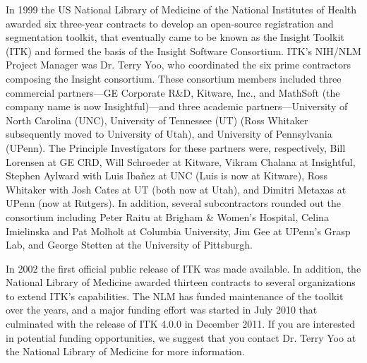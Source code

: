 In 1999 the US National Library of Medicine of the National Institutes of
Health awarded six three-year contracts to develop an open-source
registration and segmentation toolkit, that eventually came to be known as
the Insight Toolkit (ITK) and formed the basis of the Insight Software
Consortium. ITK's NIH/NLM Project Manager was Dr. Terry Yoo, who coordinated the
six prime contractors composing the Insight consortium. These consortium
members included three commercial partners---GE Corporate R\&D, Kitware,
Inc., and MathSoft (the company name is now Insightful)---and three academic
partners---University of North Carolina (UNC), University of Tennessee (UT)
(Ross Whitaker subsequently moved to University of Utah), and University of
Pennsylvania (UPenn). The Principle Investigators for these partners were,
respectively, Bill Lorensen at GE CRD, Will Schroeder at Kitware, Vikram
Chalana at Insightful, Stephen Aylward with Luis Iba\~{n}ez at UNC (Luis is now
at Kitware), Ross Whitaker with Josh Cates at UT (both now at Utah), and
Dimitri Metaxas at UPenn (now at Rutgers). In addition, several
subcontractors rounded out the consortium including Peter Raitu at Brigham \&
Women's Hospital, Celina Imielinska and Pat Molholt at Columbia University,
Jim Gee at UPenn's Grasp Lab, and George Stetten at the University of
Pittsburgh.

In 2002 the first official public release of ITK was made available. In
addition, the National Library of Medicine awarded thirteen contracts to
several organizations to extend ITK's capabilities. The NLM has funded
maintenance of the toolkit over the years, and a major funding effort was
started in July 2010 that culminated with the release of ITK 4.0.0 in
December 2011.  If you are interested in potential funding opportunities,
we suggest that you contact Dr. Terry Yoo at the National Library of Medicine
for more information.
